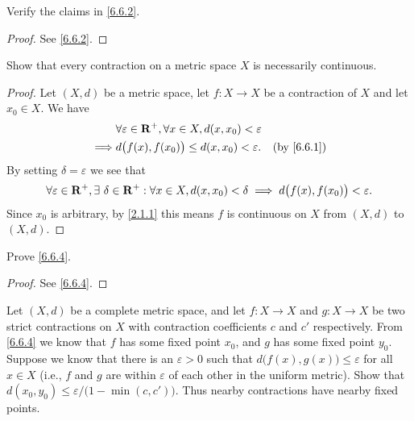 \begin{exercise}\label{ex 6.6.5}
  Verify the claims in \cref{6.6.2}.
\end{exercise}

\begin{proof}
  See \cref{6.6.2}.
\end{proof}

\begin{exercise}\label{ex 6.6.6}
  Show that every contraction on a metric space \(X\) is necessarily continuous.
\end{exercise}

\begin{proof}
  Let \((X, d)\) be a metric space, let \(f : X \to X\) be a contraction of \(X\) and let \(x_0 \in X\).
  We have
  \begin{align*}
             & \forall \varepsilon \in \R^+, \forall x \in X, d(x, x_0) < \varepsilon                            \\
    \implies & d\big(f(x), f(x_0)\big) \leq d(x, x_0) < \varepsilon.                  & \text{(by \cref{6.6.1})}
  \end{align*}
  By setting \(\delta = \varepsilon\) we see that
  \[
    \forall \varepsilon \in \mathbf{R}^+, \exists\ \delta \in \mathbf{R}^+ : \forall x \in X, d(x, x_0) < \delta \implies d\big(f(x), f(x_0)\big) < \varepsilon.
  \]
  Since \(x_0\) is arbitrary, by \cref{2.1.1} this means \(f\) is continuous on \(X\) from \((X, d)\) to \((X, d)\).
\end{proof}

\begin{exercise}\label{ex 6.6.7}
  Prove \cref{6.6.4}.
\end{exercise}

\begin{proof}
  See \cref{6.6.4}.
\end{proof}

\begin{exercise}\label{ex 6.6.8}
  Let \((X, d)\) be a complete metric space, and let \(f : X \to X\) and \(g : X \to X\) be two strict contractions on \(X\) with contraction coefficients \(c\) and \(c'\) respectively.
  From \cref{6.6.4} we know that \(f\) has some fixed point \(x_0\), and \(g\) has some fixed point \(y_0\).
  Suppose we know that there is an \(\varepsilon > 0\) such that \(d\big(f(x), g(x)\big) \leq \varepsilon\) for all \(x \in X\)
  (i.e., \(f\) and \(g\) are within \(\varepsilon\) of each other in the uniform metric).
  Show that \(d(x_0, y_0) \leq \varepsilon / \big(1 - \min(c, c')\big)\).
  Thus nearby contractions have nearby fixed points.
\end{exercise}

